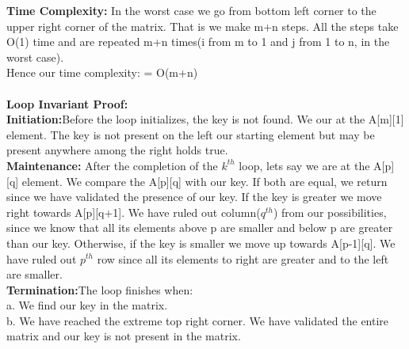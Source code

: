 \documentclass[10pt]{article}
\begin{document}
\textbf{Time Complexity: } In the worst case we go from bottom left corner to the upper right corner of the matrix. That is we make m+n steps. All the steps take O(1) time and are repeated m+n times(i from m to 1 and j from 1 to n, in the worst case).\\ Hence our time complexity: = O(m+n)\\\\
\textbf{Loop Invariant Proof:}\\
\textbf{Initiation:}Before the loop initializes, the key is not found. We our at the A[m][1] element. The key is not present on the left our starting element but may be present anywhere among the right holds true.\\
\textbf{Maintenance:} After the completion of the $k^{th}$ loop, lets say we are at the A[p][q] element. We compare the A[p][q] with our key. If both are equal, we return since we have validated the presence of our key. If the key is greater we move right towards A[p][q+1]. We have ruled out column($q^{th}$) from our possibilities, since we know that all its elements above p are smaller and below p are greater than our key. Otherwise, if the key is smaller we move up towards A[p-1][q]. We have ruled out $p^{th}$ row since all its elements to right are greater and to the left are smaller.\\
\textbf{Termination:}The loop finishes when:\\
a. We find our key in the matrix.\\
b. We have reached the extreme top right corner. We have validated the entire matrix and our key is not present in the matrix.\\
\newpage
\end{document}
